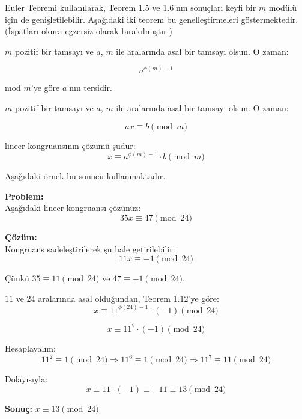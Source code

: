 \documentclass[12pt]{article}
\begin{document}
\vspace{1em}

Euler Teoremi kullanılarak, Teorem 1.5 ve 1.6'nın sonuçları keyfi bir $m$ modülü için de genişletilebilir. Aşağıdaki iki teorem bu genelleştirmeleri göstermektedir. \\
(İspatları okura egzersiz olarak bırakılmıştır.)
\vspace{2em}

\begin{tcolorbox}[colback=gray!10, colframe=black, title=\textbf{Teorem 1.16: Modüler Ters}, fonttitle=\bfseries, sharp corners]
$m$ pozitif bir tamsayı ve $a$, $m$ ile aralarında asal bir tamsayı olsun. O zaman:

\[
a^{\phi(m) - 1}
\]

mod $m$'ye göre $a$'nın tersidir.
\end{tcolorbox}

\vspace{1em}

\begin{tcolorbox}[colback=gray!10, colframe=black, title=\textbf{Teorem 1.12: Lineer Kongruansın Çözümü}, fonttitle=\bfseries, sharp corners]
$m$ pozitif bir tamsayı ve $a$, $m$ ile aralarında asal bir tamsayı olsun. O zaman:

\[
ax \equiv b \pmod{m}
\]

lineer kongruansının çözümü şudur:
\[
x \equiv a^{\phi(m) - 1} \cdot b \pmod{m}
\]
\end{tcolorbox}

\vspace{1em}

Aşağıdaki örnek bu sonucu kullanmaktadır.

\vspace{2em}

\begin{tcolorbox}[colback=gray!5, colframe=black, title=\textbf{Örnek 1.27: Lineer Kongruansın Çözümü}, fonttitle=\bfseries, sharp corners]
\textbf{Problem:}\\
Aşağıdaki lineer kongruansı çözünüz:
\[
35x \equiv 47 \pmod{24}
\]

\textbf{Çözüm:}\\
Kongruans sadeleştirilerek şu hale getirilebilir:
\[
11x \equiv -1 \pmod{24}
\]

Çünkü $35 \equiv 11 \pmod{24}$ ve $47 \equiv -1 \pmod{24}$.

$11$ ve $24$ aralarında asal olduğundan, Teorem 1.12'ye göre:
\[
x \equiv 11^{\phi(24)-1} \cdot (-1) \pmod{24}
\]

\[
x \equiv 11^7 \cdot (-1) \pmod{24}
\]

Hesaplayalım:
\[
11^2 \equiv 1 \pmod{24} \Rightarrow 11^6 \equiv 1 \pmod{24}
\Rightarrow 11^7 \equiv 11 \pmod{24}
\]

Dolayısıyla:
\[
x \equiv 11 \cdot (-1) \equiv -11 \equiv 13 \pmod{24}
\]

\textbf{Sonuç:} $x \equiv 13 \pmod{24}$
\end{tcolorbox}
\end{document}
